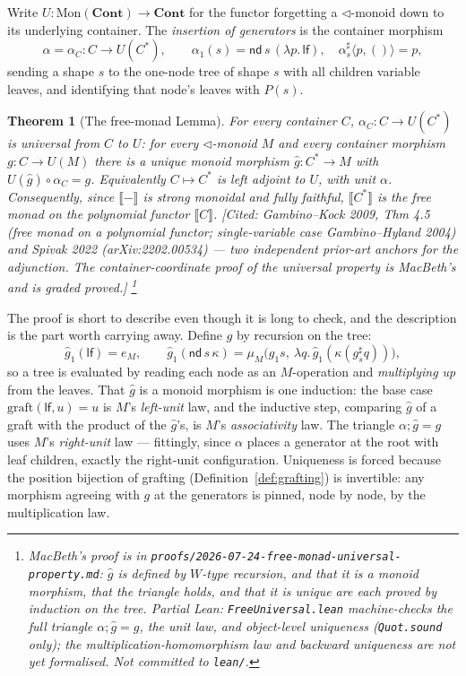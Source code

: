 \documentclass[11pt,a4paper]{book}
\newcommand{\Cont}{\mathbf{Cont}}
\newcommand{\Ext}[1]{\llbracket #1 \rrbracket}
\newcommand{\Mon}{\mathrm{Mon}}
\theoremstyle{plain}
\newtheorem{Theorem}{Theorem}[chapter]
\theoremstyle{definition}
\theoremstyle{remark}
\newcommand{\prov}[1]{\hfill\textsf{\footnotesize[#1]}}
\begin{document}
Write $U\colon\Mon(\Cont)\to\Cont$ for the functor forgetting a $\triangleleft$-monoid down to
its underlying container. The \emph{insertion of generators} is the container morphism
\[
  \alpha=\alpha_{C}\colon C\longrightarrow U(C^{*}),\qquad
  \alpha_{1}(s)=\mathsf{nd}\,s\,(\lambda p.\,\mathsf{lf}),\quad
  \alpha^{\sharp}_{s}\langle p,()\rangle=p,
\]
sending a shape $s$ to the one-node tree of shape $s$ with all children variable leaves, and
identifying that node's leaves with $P(s)$.

\begin{Theorem}[The free-monad Lemma]\label{thm:free-lemma}
For every container $C$, $\alpha_{C}\colon C\to U(C^{*})$ is universal from $C$ to $U$: for
every $\triangleleft$-monoid $M$ and every container morphism $g\colon C\to U(M)$ there is a
\emph{unique} monoid morphism $\widehat g\colon C^{*}\to M$ with $U(\widehat g)\circ\alpha_{C}=g$.
Equivalently $C\mapsto C^{*}$ is left adjoint to $U$, with unit $\alpha$. Consequently, since
$\Ext{-}$ is strong monoidal and fully faithful, $\Ext{C^{*}}$ is the free monad on the
polynomial functor $\Ext C$.
\prov{Cited: Gambino--Kock 2009, Thm 4.5 (free monad on a polynomial functor; single-variable
case Gambino--Hyland 2004) and Spivak 2022 (arXiv:2202.00534) --- two independent prior-art
anchors for the adjunction. The container-coordinate proof of the universal property is
MacBeth's and is graded \emph{proved}.}%
\footnote{MacBeth's proof is in \texttt{proofs/2026-07-24-free-monad-universal-property.md}:
$\widehat g$ is defined by $W$-type recursion, and that it is a monoid morphism, that the
triangle holds, and that it is unique are each proved by induction on the tree. Partial Lean:
\texttt{FreeUniversal.lean} machine-checks the full triangle $\alpha;\widehat g=g$, the unit
law, and object-level uniqueness (\texttt{Quot.sound} only); the multiplication-homomorphism
law and backward uniqueness are not yet formalised. Not committed to \texttt{lean/}.}
\end{Theorem}

The proof is short to describe even though it is long to check, and the description is the
part worth carrying away. Define $\widehat g$ by recursion on the tree:
\[
  \widehat g_{1}(\mathsf{lf})=e_{M},\qquad
  \widehat g_{1}(\mathsf{nd}\,s\,\kappa)=\mu_{M}\bigl(g_{1}s,\ \lambda q.\,
     \widehat g_{1}(\kappa(g^{\sharp}_{s}q))\bigr),
\]
so a tree is evaluated by reading each node as an $M$-operation and \emph{multiplying up} from
the leaves. That $\widehat g$ is a monoid morphism is one induction: the base case
$\mathrm{graft}(\mathsf{lf},u)=u$ is $M$'s \emph{left-unit} law, and the inductive step,
comparing $\widehat g$ of a graft with the product of the $\widehat g$'s, is $M$'s
\emph{associativity} law. The triangle $\alpha;\widehat g=g$ uses $M$'s \emph{right-unit} law
--- fittingly, since $\alpha$ places a generator at the root with leaf children, exactly the
right-unit configuration. Uniqueness is forced because the position bijection of grafting
(Definition~\ref{def:grafting}) is invertible: any morphism agreeing with $g$ at the
generators is pinned, node by node, by the multiplication law.
\end{document}
